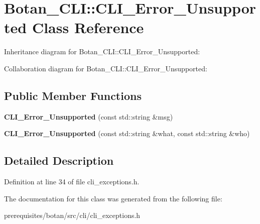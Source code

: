 \hypertarget{class_botan___c_l_i_1_1_c_l_i___error___unsupported}{}\section{Botan\+\_\+\+C\+LI\+:\+:C\+L\+I\+\_\+\+Error\+\_\+\+Unsupported Class Reference}
\label{class_botan___c_l_i_1_1_c_l_i___error___unsupported}


Inheritance diagram for Botan\+\_\+\+C\+LI\+:\+:C\+L\+I\+\_\+\+Error\+\_\+\+Unsupported\+:


Collaboration diagram for Botan\+\_\+\+C\+LI\+:\+:C\+L\+I\+\_\+\+Error\+\_\+\+Unsupported\+:
\subsection*{Public Member Functions}
\begin{DoxyCompactItemize}
\item 
\mbox{\label{class_botan___c_l_i_1_1_c_l_i___error___unsupported_a0fce5655284395f0be04d9846d07585b}} 
{\bfseries C\+L\+I\+\_\+\+Error\+\_\+\+Unsupported} (const std\+::string \&msg)
\item 
\mbox{\label{class_botan___c_l_i_1_1_c_l_i___error___unsupported_a1f1225445f6fe12d8330e289fee90f56}} 
{\bfseries C\+L\+I\+\_\+\+Error\+\_\+\+Unsupported} (const std\+::string \&what, const std\+::string \&who)
\end{DoxyCompactItemize}


\subsection{Detailed Description}


Definition at line 34 of file cli\+\_\+exceptions.\+h.



The documentation for this class was generated from the following file\+:\begin{DoxyCompactItemize}
\item 
prerequisites/botan/src/cli/cli\+\_\+exceptions.\+h\end{DoxyCompactItemize}
